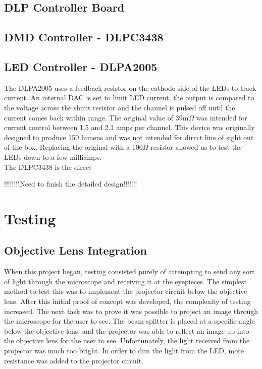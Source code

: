 \documentclass[12pt,a4paper]{article}
\begin{document}
\subsection{DLP Controller Board}

\subsection{DMD Controller - DLPC3438}


\subsection{LED Controller - DLPA2005}
The DLPA2005 uses a feedback resistor on the cathode side of the LEDs to track current. An internal DAC is set to limit LED current, the output is compared to the voltage across the shunt resistor and the channel is pulsed off until the current comes back within range. The original value of 39m$\Omega$ was intended for current control between 1.5 and 2.1 amps per channel. This device was originally designed to produce 150 lumens and was not intended for direct line of sight out of the box. Replacing the original with a 100$\Omega$ resistor allowed us to test the LEDs down to a few milliamps. 
\\
The DLPC3438 is the direct 



!!!!!!!!Need to finish the detailed design!!!!!!!


\section{Testing}
\subsection{Objective Lens Integration}
When this project began, testing consisted purely of attempting to send any sort of light through the microscope and receiving it at the eyepieces. The simplest method to test this was to implement the projector circuit below the objective lens. After this initial proof of concept was developed, the complexity of testing increased. The next task was to prove it was possible to project an image through the microscope for the user to see. The beam splitter is placed at a specific angle below the objective lens, and the projector was able to reflect an image up into the objective lens for the user to see. Unfortunately, the light received from the projector was much too bright. In order to dim the light from the LED, more resistance was added to the projector circuit.
\end{document}
